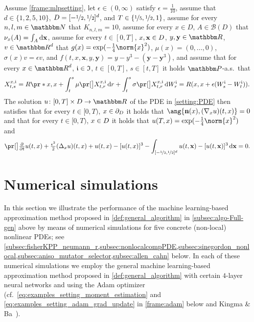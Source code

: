 \begin{example}
	Assume 
		\cref{frame:mlpsetting},
	let
		$\epsilon\in(0,\infty)$
	satisfy 
		$\epsilon = \tfrac{1}{10}$,
	assume that
		$d\in\{1,2,5,10\}$,
		$D = [-\nicefrac12, \nicefrac12]^d$, and
		$T\in\{\nicefrac{1}{5},\nicefrac{1}{2},1\}$,
	assume for every 
		$n,l,m\in \N$ 
	that
		$K_{n,l,m} = 10$,
	assume for every
		$x \in D$,
		$A \in \mathcal{B}(D)$
	that
		$\nu_x(A) = \int_A \mathrm{d}\mathbf{x}$,
	assume for every 
		$t \in [0,T]$,
		$x,\mathbf{x} \in D$,
		$y,\mathbf{y} \in \R$,
		$v \in \R^d$ 
	that
		$g(x)= \exp (- \tfrac{1}{4}\norm{x}^2)$,
		$\mu(x)=(0,\dots,0)$,
		$\sigma(x) v = \epsilon v$, and
		$f(t,x,{\mathbf x},y,{\mathbf y})= y - y^3 - (\mathbf{y} - {\mathbf y}^3)$,
	and	assume that 
		for every 
			$x\in \R^{d}$, 
			$\mathfrak{i} \in \mathfrak{I}$, 
			$t\in [0,T]$, 
			$s\in [t,T]$ 
		it holds $\P$-a.s.\ that
		\begin{equation}
			X^{x,\dindex}_{t,s} 
			= 
			R\pr*{x,x + \int_{t}^{s} \mu\bpr{X^{x,\dindex}_{t,r}} \, \diff r + \int^{s}_{t} \sigma \bpr{X^{x,\dindex}_{t,r}} \, \diff W^{\dindex}_{r} }
			=
			R(x,x+\epsilon(W^\dindex_s-W^\dindex_t))
			.
		\end{equation}
	The solution 
		$u\colon[0,T]\times \D \to \R$ 
	of the PDE in \eqref{setting:PDE} then satisfies that 
		for every
			$t\in [0,T)$, 
			$x\in\partial_D$
		it holds that
			$\ang{\mathbf{n}(x) ,(\nabla_x u)(t,x)} = 0$
		and that for every
			$t\in [0,T)$, $x\in D$
		it holds that
			$u(T,x) = \exp (- \tfrac{1}{4}\norm{x}^2)$ and			
		\begin{equation}
			\label{eqMLP:allen_cahn}
			\bpr{\tfrac{\partial}{\partial t}u}(t,x)
			+
			\tfrac{\epsilon^2}{2} (\Delta_x u)(t,x) 
			+ 
			u(t,x) - [u(t,x)]^3 
			- 
			\int_{[-\nicefrac12,\nicefrac12]^d} u(t,\mathbf{x}) - [u(t,\mathbf{x})]^3\, \diff \mathbf{x} 
			=
			0
			.
		\end{equation}
\end{example}


\section{Numerical simulations}
\label{sec:examples}
In this section we illustrate the performance of the machine learning-based approximation method proposed in \cref{def:general_algorithm} in \cref{subsec:algo-Full-gen} above by means of numerical simulations for five concrete (non-local) nonlinear PDEs; see \cref{subsec:fisherKPP_neumann_r,subsec:nonlocalcompPDE,subsec:sinegordon_nonlocal,subsec:aniso_mutator_selector,subsec:allen_cahn} below. In each of these numerical simulations we employ the general machine learning-based approximation method proposed in \cref{def:general_algorithm} with certain $4$-layer neural networks and using the Adam optimizer (cf.\ \eqref{eq:examples_setting_moment_estimation} and \eqref{eq:examples_setting_adam_grad_update} in \cref{frame:adam} below and Kingma \& Ba~\cite{Kingma2014}).

